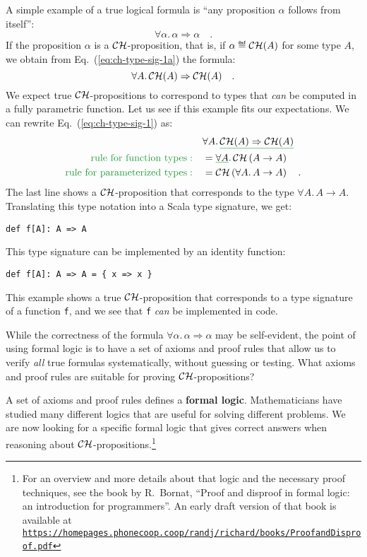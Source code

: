 A simple example of a true logical formula is \textsf{``}any proposition $\alpha$
follows from itself\textsf{''}:
\begin{equation}
\forall\alpha.\,\alpha\Rightarrow\alpha\quad.\label{eq:ch-type-sig-1a}
\end{equation}
If the proposition $\alpha$ is a ${\cal CH}$-proposition, that is,
if $\alpha\triangleq{\cal CH}(A)$ for some type $A$, we obtain from
Eq.~(\ref{eq:ch-type-sig-1a}) the formula:
\begin{equation}
\forall A.\,{\cal CH}(A)\Rightarrow{\cal CH}(A)\quad.\label{eq:ch-type-sig-1}
\end{equation}
We expect true ${\cal CH}$-propositions to correspond to types that
\emph{can} be computed in a fully parametric function. Let us see
if this example fits our expectations. We can rewrite Eq.~(\ref{eq:ch-type-sig-1})
as:
\begin{align*}
 & \forall A.\,\gunderline{{\cal CH}(A)\Rightarrow{\cal CH}(A)}\\
{\color{greenunder}\text{rule for function types}:}\quad & =\gunderline{\forall A}.\,{\cal CH}\left(A\rightarrow A\right)\\
{\color{greenunder}\text{rule for parameterized types}:}\quad & ={\cal CH}\left(\forall A.\,A\rightarrow A\right)\quad.
\end{align*}
The last line shows a ${\cal CH}$-proposition that corresponds to
the type $\forall A.\,A\rightarrow A$. Translating this type notation
into a Scala type signature, we get:
\begin{lstlisting}
def f[A]: A => A
\end{lstlisting}
This type signature can be implemented by an identity function:
\begin{lstlisting}
def f[A]: A => A = { x => x }
\end{lstlisting}
This example shows a true ${\cal CH}$-proposition that corresponds
to a type signature of a function \lstinline!f!, and we see that
\lstinline!f! \emph{can} be implemented in code.

While the correctness of the formula $\forall\alpha.\,\alpha\Rightarrow\alpha$
may be self-evident, the point of using formal logic is to have a
set of axioms and proof rules that allow us to verify \emph{all} true
formulas systematically, without guessing or testing. What axioms
and proof rules are suitable for proving ${\cal CH}$-propositions?

A set of axioms and proof rules defines a \textbf{formal logic}.
Mathematicians have studied many different logics that are useful
for solving different problems. We are now looking for a specific
formal logic that gives correct answers when reasoning about ${\cal CH}$-propositions.\footnote{\label{fn:Bornat-proof-book}For an overview
and more details about that logic and the necessary proof techniques,
see the book by R.~Bornat, \textsf{``}Proof and disproof in formal logic:
an introduction for programmers\textsf{''}. An early draft version of that
book is available at \texttt{\href{https://homepages.phonecoop.coop/randj/richard/books/ProofandDisproof.pdf}{https://homepages.phonecoop.coop/randj/richard/books/ProofandDisproof.pdf}}}

